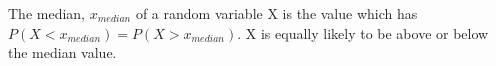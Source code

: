 The median, $x_{median}$  of a random variable X is the value which has $P(X<x_{median})=P(X>x_{median}).$  X is equally likely to be above
or below the median value.